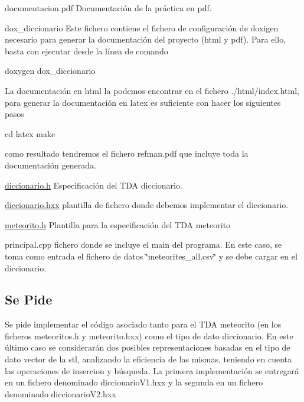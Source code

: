 \begin{DoxyItemize}
\item documentacion.\-pdf Documentación de la práctica en pdf. \item dox\-\_\-diccionario Este fichero contiene el fichero de configuración de doxigen necesario para generar la documentación del proyecto (html y pdf). Para ello, basta con ejecutar desde la línea de comando 
\begin{DoxyCode}
doxygen dox\_diccionario
\end{DoxyCode}
 La documentación en html la podemos encontrar en el fichero ./html/index.html, para generar la documentación en latex es suficiente con hacer los siguientes pasos 
\begin{DoxyCode}
cd latex
make
\end{DoxyCode}
 como resultado tendremos el fichero refman.\-pdf que incluye toda la documentación generada.\end{DoxyItemize}
\begin{DoxyItemize}
\item \hyperlink{diccionario_8h_source}{diccionario.\-h} Especificación del T\-D\-A diccionario. \item \hyperlink{diccionario_8hxx_source}{diccionario.\-hxx} plantilla de fichero donde debemos implementar el diccionario. \item \hyperlink{meteorito_8h_source}{meteorito.\-h} Plantilla para la especificación del T\-D\-A meteorito\end{DoxyItemize}
\begin{DoxyItemize}
\item principal.\-cpp fichero donde se incluye el main del programa. En este caso, se toma como entrada el fichero de datos \char`\"{}meteorites\-\_\-all.\-csv\char`\"{} y se debe cargar en el diccionario.\end{DoxyItemize}
\hypertarget{index_ssPide}{}\subsection{Se Pide}\label{index_ssPide}
Se pide implementar el código asociado tanto para el T\-D\-A meteorito (en los ficheros meteoritos.\-h y meteorito.\-hxx) como el tipo de dato diccionario. En este último caso se considerarán dos posibles representaciones basadas en el tipo de dato vector de la stl, analizando la eficiencia de las mismas, teniendo en cuenta las operaciones de insercion y búsqueda. La primera implementación se entregará en un fichero denominado diccionario\-V1.\-hxx y la segunda en un fichero denominado diccionario\-V2.\-hxx

